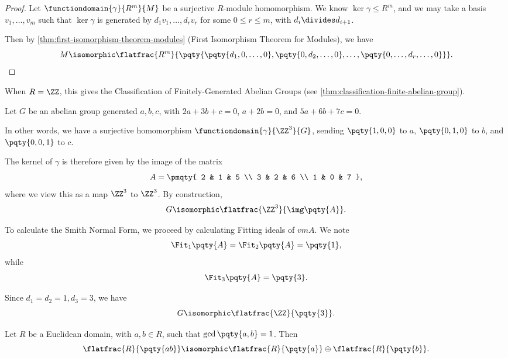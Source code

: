 \begin{proof}
    Let \(\functiondomain{\gamma}{R^m}{M}\) be a surjective \(R\)-module homomorphism. We know \(\ker \gamma \leq R^m\), and we may take a basis \(v_1, \ldots, v_m\) such that \(\ker \gamma\) is generated by \(d_1 v_1, \ldots, d_r v_r\) for some \(0 \leq r \leq m\), with \(d_i \divides d_{i + 1}\).

    Then by \autoref{thm:first-isomorphism-theorem-modules} (First Isomorphism Theorem for Modules), we have
    \[
        M \isomorphic \flatfrac{R^m}{\pqty{\pqty{d_1, 0, \ldots, 0}, \pqty{0, d_2, \ldots, 0}, \ldots, \pqty{0, \ldots, d_r, \ldots, 0}}}.
    \]
\end{proof}

\begin{remark}
    When \(R = \ZZ\), this gives the Classification of Finitely-Generated Abelian Groups (see \autoref{thm:classification-finite-abelian-group}).
\end{remark}

\begin{example*}
    Let \(G\) be an abelian group generated \(a, b, c\), with \(2a + 3b + c = 0\), \(a + 2b = 0\), and \(5a + 6b + 7c = 0\).

    In other words, we have a surjective homomorphism \(\functiondomain{\gamma}{\ZZ^3}{G}\), sending \(\pqty{1, 0, 0}\) to \(a\), \(\pqty{0, 1, 0}\) to \(b\), and \(\pqty{0, 0, 1}\) to \(c\).

    The kernel of \(\gamma\) is therefore given by the image of the matrix
    \[
        A = \pmqty{
            2 & 1 & 5 \\
            3 & 2 & 6 \\
            1 & 0 & 7
        },
    \]
    where we view this as a map \(\ZZ^3\) to \(\ZZ^3\). By construction,
    \[
        G \isomorphic \flatfrac{\ZZ^3}{\img \pqty{A}}.
    \]

    To calculate the Smith Normal Form, we proceed by calculating Fitting ideals of 
    \(vm{A}\). We note
    \[
        \Fit_1 \pqty{A} = \Fit_2 \pqty{A} = \pqty{1},
    \]
    while
    \[
        \Fit_3 \pqty{A} = \pqty{3}.
    \]

    Since \(d_1 = d_2 = 1, d_3 = 3\), we have
    \[
        G \isomorphic \flatfrac{\ZZ}{\pqty{3}}.
    \]
\end{example*}

\begin{proposition}
    \label{prop:crt-modules}%
    Let \(R\) be a Euclidean domain, with \(a, b \in R\), such that \(\gcd\pqty{a, b} = 1\). Then
    \[
        \flatfrac{R}{\pqty{ab}} \isomorphic \flatfrac{R}{\pqty{a}} \oplus \flatfrac{R}{\pqty{b}}.
    \]
\end{proposition}

